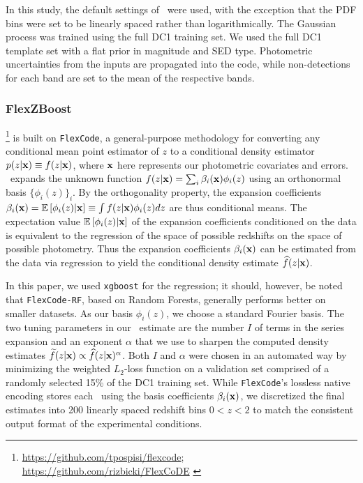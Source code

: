 In this study, the default settings of \delight\ were used, with the exception that the PDF bins were set to be linearly spaced rather than logarithmically.
The Gaussian process was trained using the full DC1 training set.
We used the full DC1 template set with a flat prior in magnitude and SED type.
Photometric uncertainties from the inputs are propagated into the code, while non-detections for each band are set to the mean of the respective bands.
\subsubsection{FlexZBoost}

\flexzboost \footnote{\url{https://github.com/tpospisi/flexcode};\\ \url{https://github.com/rizbicki/FlexCoDE} \label{flexzboost_github}} \citep{izbicki_converting_2017} is built on \texttt{FlexCode}, a general-purpose methodology for converting any conditional mean point estimator of $z$ to a conditional density estimator $p(z \vert {\mathbf{x}}) \equiv f(z \vert {\mathbf{x}})$, where ${\mathbf{x}}$ here represents our photometric covariates and errors.
\flexzboost\ expands the unknown function $f(z \vert {\mathbf{x}}) = \sum_{i}\beta_{i}({\mathbf{x}})\phi_{i}(z)$ using an orthonormal basis $\{\phi_{i}(z)\}_{i}$.
By the orthogonality property, the expansion coefficients $\beta_{i}({\mathbf{x}}) = \mathbb{E}\left[\phi_i(z)|{\mathbf{x}}\right] \equiv \int f(z \vert {\mathbf{x}}) \phi_{i}(z) dz$ are thus conditional means.
The expectation value $\mathbb{E}\left[\phi_i(z) \vert {\mathbf{x}}\right]$ of the expansion coefficients conditioned on the data is equivalent to the regression of the space of possible redshifts on the space of possible photometry.
Thus the expansion coefficients $\beta_{i}({\mathbf{x}})$ can be estimated from the data via regression to yield the conditional density estimate $\widehat{f}(z \vert {\mathbf{x}})$.

In this paper, we used \texttt{xgboost} \citep{chen_xgboost:_2016} for the regression; it should, however, be noted that \texttt{FlexCode-RF}, based on Random Forests, generally performs better on smaller datasets.
As our basis $\phi_{i}(z)$, we choose a standard Fourier basis.
The two tuning parameters in our \pzpdf\ estimate are the number $I$ of terms in the series expansion and an exponent $\alpha$ that we use to sharpen the computed density estimates $\widetilde{f}(z \vert {\mathbf{x}}) \propto \widehat{f}(z \vert {\mathbf{x}})^{\alpha}$.
Both $I$ and $\alpha$ were chosen in an automated way by minimizing the weighted $L_2$-loss function \citep[Eq. 5 in][]{izbicki_converting_2017} on a validation set comprised of a randomly selected 15\% of the DC1 training set.
While \texttt{FlexCode}'s lossless native encoding stores each \pzpdf\ using the basis coefficients $\beta_{i}({\mathbf{x}})$, we discretized the final estimates into 200 linearly spaced redshift bins $0 < z < 2$ to match the consistent output format of the experimental conditions.

